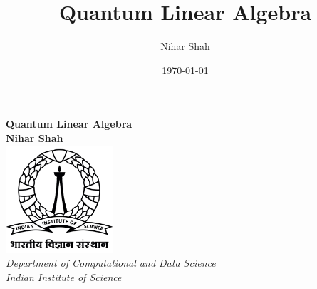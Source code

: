 \documentclass[12pt, oneside]{book}
\theoremstyle{definition}
\theoremstyle{definition}
\theoremstyle{remark}
\begin{document}
\frontmatter

\title{\vspace{-3.0cm}Quantum Linear Algebra}  %
\author{Nihar Shah}  %
\date{\today}  %
\maketitle  %

\begin{center}
\vspace*{2cm}
\textbf{Quantum Linear Algebra}\\[1cm]
\textbf{Nihar Shah}\\[1cm]
\vfill
\includegraphics[width=0.3\textwidth]{images/IISc_Master_Seal_Black.jpg}\\[1cm]
\large \textit{Department of Computational and Data Science}\\
\large \textit{Indian Institute of Science}
\vfill
\end{center}

\frontmatter
\end{document}
